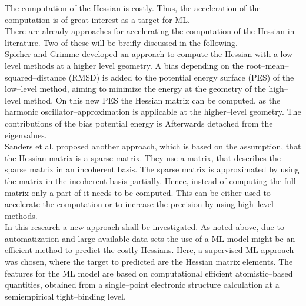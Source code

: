 The computation of the Hessian is costly.\supercite{SpicherSHP2021}
Thus, the acceleration of the computation is of great interest as a target for ML.\\
\newpage
There are already approaches for accelerating the computation of the Hessian in literature.\supercite{Lindh1995,Sanders2015,SpicherSHP2021}
Two of these will be breifly discussed in the following.\\
Spicher and Grimme developed an approach to compute the Hessian with a low--level methods at a higher level geometry.
A bias depending on the root--mean--squared--distance (RMSD) is added to the potential energy surface (PES) of the low--level method,
aiming to minimize the energy at the geometry of the high--level method.
On this new PES the Hessian matrix can be computed, as the harmonic oscillator--approximation is applicable at the higher--level geometry.\supercite{SpicherSHP2021}
The contributions of the bias potential energy is Afterwards detached from the eigenvalues.\\
Sanders et al. proposed another approach, which is based on the assumption, that the Hessian matrix is a sparse matrix.
They use a matrix, that describes the sparse matrix in an incoherent basis.
The sparse matrix is approximated by using the matrix in the incoherent basis partially.
Hence, instead of computing the full matrix only a part of it needs to be computed.
This can be either used to accelerate the computation or to increase the precision by using high--level methods.\supercite{Sanders2015}\\
In this research a new approach shall be investigated.
As noted above, due to automatization and large available data sets the use of a ML model might be an efficient method to predict the costly Hessians.
Here, a supervised ML approach was chosen, where the target to predicted are the Hessian matrix elements.
The features for the ML model are based on computational efficient atomistic--based quantities,
 obtained from a single--point electronic structure calculation at a semiempirical tight--binding level.